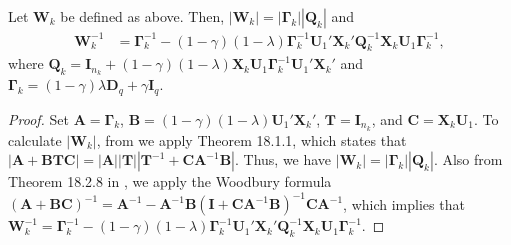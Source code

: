 \documentclass[11pt]{article}
\begin{document}
\begin{proposition}\label{proposition:rda-W_k}
Let $\bm W_k$ be defined as above. Then, $|\bm W_k| = |\bm \Gamma_k| |\bm Q_k|$ and
	\begin{align}
		\bm W_k^{-1} &= \bm \Gamma_k^{-1} - (1 - \gamma)(1 - \lambda) \bm \Gamma_k^{-1} \bm U_1' \bm X_k' \bm Q_k^{-1} \bm X_k \bm U_1 \bm \Gamma_k^{-1},
	\end{align}
where $\bm Q_k = \bm I_{n_k} + (1 - \gamma)(1- \lambda) \bm X_k \bm U_1 \bm \Gamma_k^{-1} \bm U_1' \bm X_k'$ and $\bm \Gamma_k = (1 - \gamma) \lambda \bm D_q + \gamma \bm I_q$.
\end{proposition}
\begin{proof}
	Set $\bm A = \bm \Gamma_k$, $\bm B = (1 - \gamma)(1 - \lambda) \bm U_1' \bm X_k'$, $\bm T = \bm I_{n_k}$, and $\bm C = \bm X_k \bm U_1$. To calculate $|\bm W_k|$, from \cite{Harville:2008wja} we apply Theorem 18.1.1, which states that $|\bm A + \bm B \bm T \bm C| = |\bm A| |\bm T| |\bm T^{-1} + \bm C \bm A^{-1} \bm B|$. Thus, we have $|\bm W_k| = |\bm \Gamma_k| |\bm Q_k|$. Also from Theorem 18.2.8 in \cite{Harville:2008wja}, we apply the Woodbury formula $(\bm A + \bm B \bm C)^{-1} = \bm A^{-1} - \bm A^{-1} \bm B(\bm I + \bm C \bm A^{-1} \bm B)^{-1} \bm C \bm A^{-1}$, which implies that $\bm W_k^{-1} = \bm \Gamma_k^{-1} - (1 - \gamma)(1 - \lambda) \bm \Gamma_k^{-1} \bm U_1' \bm X_k' \bm Q_k^{-1} \bm X_k \bm U_1 \bm \Gamma_k^{-1}$.
\end{proof}
\end{document}
